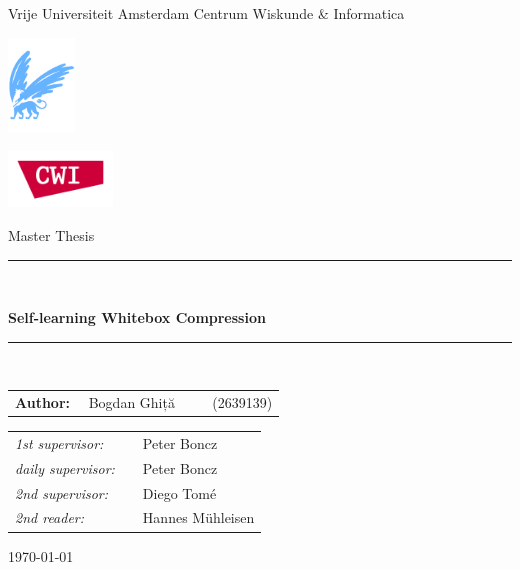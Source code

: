 \documentclass[twoside,11pt]{Latex/Classes/PhDthesisPSnPDF}
\begin{document}
\thispagestyle{empty}

\begin{center}

Vrije Universiteit Amsterdam \hspace*{2cm} Centrum Wiskunde \& Informatica

\vspace{1mm}

\hspace*{-7.5cm}\includegraphics[height=25mm]{0_frontmatter/figures/vu-griffioen.pdf}

\vspace*{-2cm}\hspace*{7.5cm}\includegraphics[height=15mm]{0_frontmatter/figures/cwi-logo.png}

\vspace{2cm}

{\Large Master Thesis}

\vspace*{1.5cm}

\rule{.9\linewidth}{.6pt}\\[0.4cm]
{\huge \bfseries Self-learning Whitebox Compression\par}\vspace{0.4cm}
\rule{.9\linewidth}{.6pt}\\[1.5cm]

\vspace*{2mm}

{\Large
\begin{tabular}{l}
{\bf Author:} ~~Bogdan Ghiță ~~~~ (2639139)
\end{tabular}
}

\vspace*{2cm}

\begin{tabular}{ll}
{\it 1st supervisor:}   & ~~Peter Boncz \\
{\it daily supervisor:} & ~~Peter Boncz \\
{\it 2nd supervisor:} & ~~Diego Tomé \\
{\it 2nd reader:}       & ~~Hannes Mühleisen
\end{tabular}

\vspace*{2.5cm}


\vspace*{1.8cm}

\today\\[4cm] %

\end{center}
\end{document}

